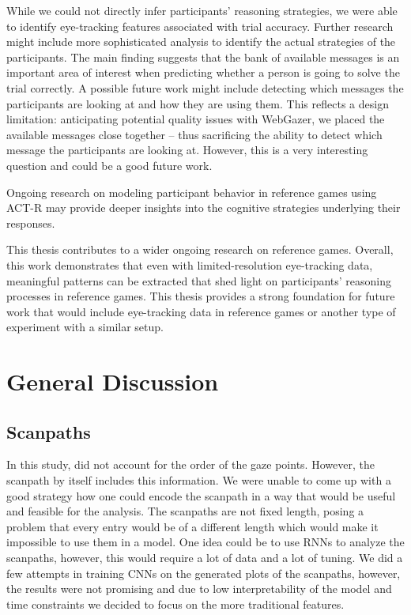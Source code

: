 While we could not directly infer participants' reasoning strategies, we were able to identify eye-tracking features associated with trial accuracy. Further research might include more sophisticated analysis to identify the actual strategies of the participants. The main finding suggests that the bank of available messages is an important area of interest when predicting whether a person is going to solve the trial correctly. A possible future work might include detecting which messages the participants are looking at and how they are using them. This reflects a design limitation: anticipating potential quality issues with WebGazer, we placed the available messages close together -- thus sacrificing the ability to detect which message the participants are looking at. However, this is a very interesting question and could be a good future work.

Ongoing research on modeling participant behavior in reference games using ACT-R \citep{Duff_2025} may provide deeper insights into the cognitive strategies underlying their responses.

This thesis contributes to a wider ongoing research on reference games. Overall, this work demonstrates that even with limited-resolution eye-tracking data, meaningful patterns can be extracted that shed light on participants' reasoning processes in reference games. This thesis provides a strong foundation for future work that would include eye-tracking data in reference games or another type of experiment with a similar setup. 


\section{General Discussion}
\label{sec:general-discussion}

\subsection{Scanpaths}
\label{sec:general-discussion:scanpaths}
In this study, did not account for  the order of the gaze points. However, the scanpath by itself includes this information. We were unable to come up with a good strategy how one could encode the scanpath in a way that would be useful and feasible for the analysis. The scanpaths are not fixed length, posing a problem that every entry would be of a different length which would make it impossible to use them in a model. One idea could be to use RNNs to analyze the scanpaths, however, this would require a lot of data and a lot of tuning. We did a few attempts in training CNNs on the generated plots of the scanpaths, however, the results were not promising and due to low interpretability of the model and time constraints we decided to focus on the more traditional features.

